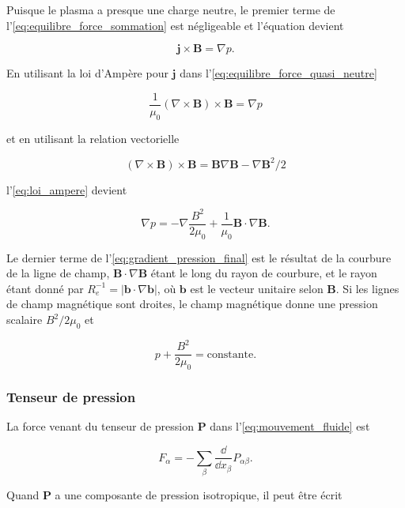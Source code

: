\documentclass[main.tex]{subfiles}
\begin{document}
\noindent Puisque le plasma a presque une charge neutre, le premier terme de l'\autoref{eq:equilibre_force_sommation} est négligeable et l'équation devient

\begin{equation}
	\bm{j} \times \bm{B} = \nabla p.
	\label{eq:equilibre_force_quasi_neutre}
\end{equation}

\noindent En utilisant la loi d'Ampère pour \( \bm{j} \) dans l'\autoref{eq:equilibre_force_quasi_neutre}

\begin{equation}
	\frac{1}{\mu_0} \left(\nabla \times \bm{B}\right) \times \bm{B} = \nabla p
	\label{eq:loi_ampere}
\end{equation}

\noindent et en utilisant la relation vectorielle

\[
	\left( \nabla \times \bm{B} \right) \times \bm{B} = \bm{B} \nabla \bm{B} - \nabla \bm{B}^2 / 2
\]

\noindent l'\autoref{eq:loi_ampere} devient

\begin{equation}
	\nabla p = - \nabla \frac{B^2}{2 \mu_0} + \frac{1}{\mu_0} \bm{B} \cdot \nabla \bm{B}.
	\label{eq:gradient_pression_final}
\end{equation}

\noindent Le dernier terme de l'\autoref{eq:gradient_pression_final} est le résultat de la courbure de la ligne de champ, \( \bm{B} \cdot \nabla \bm{B} \) étant le long du rayon de courbure, et le rayon étant donné par \( R_e^{-1} = \left| \bm{b} \cdot \nabla \bm{b} \right| \), où \( \bm{b} \) est le vecteur unitaire selon \( \bm{B} \).
Si les lignes de champ magnétique sont droites, le champ magnétique donne une pression scalaire \( B^2 / 2\mu_0 \) et

\[
	p + \frac{B^2}{2\mu_0} = \text{constante}.
\]

\subsubsection*{Tenseur de pression}

La force venant du tenseur de pression \( \bm{P} \) dans l'\autoref{eq:mouvement_fluide} est

\[
	F_\alpha = - \sum_{\beta} \frac{\dd}{\dd x_\beta} P_{\alpha \beta}.
\]

\noindent Quand \( \bm{P} \) a une composante de pression isotropique, il peut être écrit
\end{document}
